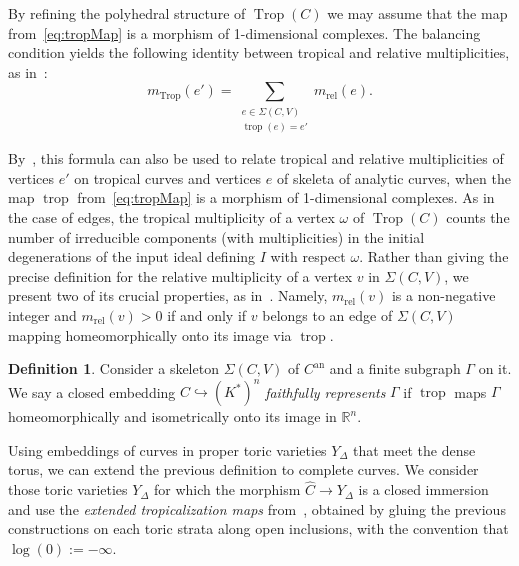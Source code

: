 \documentclass[11pt]{amsart}
\numberwithin{equation}{section}
\theoremstyle{plain}
\theoremstyle{definition}
\newtheorem{definition}[theorem]{Definition}
\theoremstyle{remark}
\begin{document}
By refining the polyhedral structure of $\operatorname{Trop}(C)$ we may assume that
the map from~\eqref{eq:tropMap} is a morphism of 1-dimensional
complexes. The balancing condition yields the following identity
between tropical and relative multiplicities, as
in~\cite[Proposition~4.24]{BPR11}:
\begin{equation}
  m_\operatorname{Trop}(e')=\sum_{\substack{ e\in \Sigma(C,V)\\ \operatorname{trop}(e)=e'}}m_{\operatorname{rel}}(e).\label{eq:tropMultVsRelMult}
\end{equation}

By~\cite[Proposition~4.24]{BPR11}, this formula can also be used to
relate tropical and relative multiplicities of vertices $e'$ on
tropical curves and vertices $e$ of skeleta of analytic curves, when
the map $\operatorname{trop}$ from~\eqref{eq:tropMap} is a morphism of 1-dimensional
complexes.  As in the case of edges, the tropical multiplicity of a
vertex ${\omega}$ of $\operatorname{Trop}(C)$ counts the number of irreducible components
(with multiplicities) in the initial degenerations of the input ideal
defining $I$ with respect ${\omega}$. Rather than giving the precise
definition for the relative multiplicity of a vertex $v$ in
$\Sigma(C,V)$, we present two of its crucial properties, as
in~\cite[Corollary 6.12]{BPR11}. Namely, $m_{\operatorname{rel}}(v)$
is a non-negative integer and $m_{\operatorname{rel}}(v)>0$ if and
only if $v$ belongs to an edge of $\Sigma(C,V)$ mapping
homeomorphically onto its image via $\operatorname{trop}$.

\begin{definition} Consider a skeleton $\Sigma(C,V)$ of $C^\operatorname{an}$ and
  a finite subgraph $\Gamma$ on it.  We say a closed embedding
  $C\hookrightarrow (K^*)^n$ \emph{faithfully represents} $\Gamma$ if
  $\operatorname{trop}$ maps $\Gamma$ homeomorphically and isometrically onto its
  image in ${\mathbb{R}}^n$.
\end{definition}

Using embeddings of curves in proper toric varieties $Y_{\Delta}$ that
meet the dense torus, we can extend the previous definition to
complete curves. We consider those toric varieties $Y_{\Delta}$ for
which the morphism $\widehat{C} \to Y_{\Delta}$ is a closed immersion
and use the \emph{extended tropicalization maps} from~\cite{Pay09},
obtained by gluing the previous constructions on each toric strata
along open inclusions, with the convention that $\log(0):=-\infty$.
\end{document}
